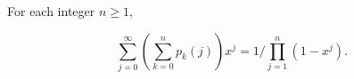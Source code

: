 For each integer $n \geq 1,$

$$\sum_{j=0}^{\infty} \left( \sum_{k=0}^{n} p_k(j) \right)x^j = 1 / \prod_{j=1}^{n} (1-x^j).$$
